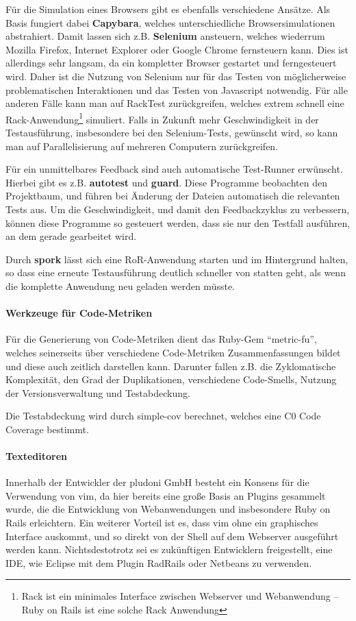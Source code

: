 Für die Simulation eines Browsers gibt es ebenfalls verschiedene Ansätze. Als Basis fungiert dabei \textbf{Capybara}, welches unterschiedliche Browsersimulationen abstrahiert. Damit lassen sich z.B. \textbf{Selenium} ansteuern, welches wiederrum Mozilla Firefox, Internet Explorer oder Google Chrome fernsteuern kann. Dies ist allerdings sehr langsam, da ein kompletter Browser gestartet und ferngesteuert wird. Daher ist die Nutzung von Selenium nur für das Testen von möglicherweise problematischen Interaktionen und das Testen von Javascript notwendig. Für alle anderen Fälle kann man auf RackTest zurückgreifen, welches extrem schnell eine Rack-Anwendung\footnote{Rack ist ein minimales Interface zwischen Webserver und Webanwendung -- Ruby on Rails ist eine solche Rack Anwendung} simuliert.
Falls in Zukunft mehr Geschwindigkeit in der Testausführung, insbesondere bei den Selenium-Tests, gewünscht wird, so kann man auf Parallelisierung auf mehreren Computern zurückgreifen.

Für ein unmittelbares Feedback sind auch automatische Test-Runner erwünscht. Hierbei gibt es z.B. \textbf{autotest} und \textbf{guard}. Diese Programme beobachten den Projektbaum, und führen bei Änderung der Dateien automatisch die relevanten Tests aus. Um die Geschwindigkeit, und damit den Feedbackzyklus zu verbessern, können diese Programme so gesteuert werden, dass sie nur den Testfall ausführen, an dem gerade gearbeitet wird.

Durch \textbf{spork} lässt sich eine RoR-Anwendung starten und im Hintergrund halten, so dass eine erneute Testausführung deutlich schneller von statten geht, als wenn die komplette Anwendung neu geladen werden müsste.


\paragraph{Werkzeuge für Code-Metriken}  Für die Generierung von Code-Metriken dient das Ruby-Gem "`metric-fu"', welches seinerseits über verschiedene Code-Metriken Zusammenfassungen bildet und diese auch zeitlich darstellen kann. Darunter fallen z.B. die Zyklomatische Komplexität, den Grad der Duplikationen, verschiedene Code-Smells, Nutzung der Versionsverwaltung und Testabdeckung.

Die Testabdeckung wird durch simple-cov berechnet, welches eine C0 Code Coverage bestimmt.

\paragraph{Texteditoren} Innerhalb der Entwickler der pludoni GmbH besteht ein Konsens für die Verwendung von vim, da hier bereits eine große Basis an Plugins gesammelt wurde, die die Entwicklung von Webanwendungen und insbesondere Ruby on Rails erleichtern. Ein weiterer Vorteil ist es, dass vim ohne ein graphisches Interface auskommt, und so direkt von der Shell auf dem Webserver ausgeführt werden kann.
Nichtsdestotrotz sei es zukünftigen Entwicklern freigestellt, eine IDE, wie Eclipse mit dem Plugin RadRails oder Netbeans zu verwenden.

